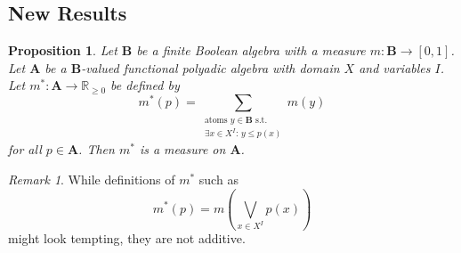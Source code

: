 \documentclass{article}
\newtheorem{proposition}{Proposition}
\theoremstyle{definition}
\theoremstyle{remark}
\newtheorem*{remark}{Remark}
\begin{document}
\subsection{New Results}

\begin{proposition}
  Let $\mathbf{B}$ be a finite Boolean algebra with a measure $m :
  \mathbf{B} \to [0, 1]$. Let $\mathbf{A}$ be a $\mathbf{B}$-valued functional
  polyadic algebra with domain $X$ and variables $I$. Let $m^* : \mathbf{A} \to
  \mathbb{R}_{\ge 0}$ be defined by
  \[
    m^*(p) = \sum_{\substack{\text{atoms }y \in \mathbf{B} \text{ s.t.}\\ \exists x \in X^I:\, y \le p(x)}} m(y)
  \]
  for all $p \in \mathbf{A}$. Then $m^*$ is a measure on $\mathbf{A}$.
\end{proposition}

\begin{remark}
  While definitions of $m^*$ such as
  \[
    m^*(p) = m \left( \bigvee_{x \in X^I} p(x) \right)
  \]
  might look tempting, they are not additive.
\end{remark}
\end{document}
